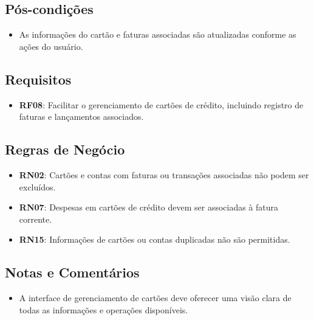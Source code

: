 \subsection*{Pós-condições}
\begin{addmargin}[1.5cm]{0cm}
    \begin{itemize}
        \item As informações do cartão e faturas associadas são atualizadas conforme as ações do usuário.
    \end{itemize}
\end{addmargin}

\subsection*{Requisitos}
\begin{addmargin}[1.5cm]{0cm}
	\begin{itemize}
        \item \textbf{RF08}: Facilitar o gerenciamento de cartões de crédito, incluindo registro de faturas e lançamentos associados.
	\end{itemize}
\end{addmargin}

\subsection*{Regras de Negócio}
\begin{addmargin}[1.5cm]{0cm}
    \begin{itemize}
        \item \textbf{RN02}: Cartões e contas com faturas ou transações associadas não podem ser excluídos.
        \item \textbf{RN07}: Despesas em cartões de crédito devem ser associadas à fatura corrente.
        \item \textbf{RN15}: Informações de cartões ou contas duplicadas não são permitidas.
    \end{itemize}
\end{addmargin}

\subsection*{Notas e Comentários}
\begin{addmargin}[1.5cm]{0cm}
    \begin{itemize}
        \item A interface de gerenciamento de cartões deve oferecer uma visão clara de todas as informações e operações disponíveis.
    \end{itemize}
\end{addmargin}
